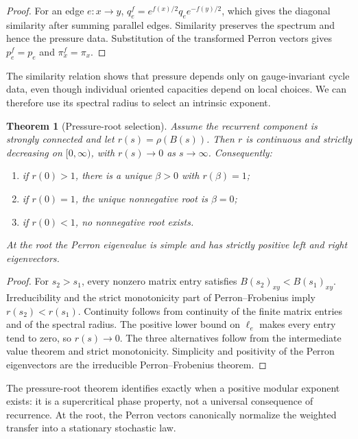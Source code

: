 \documentclass[11pt]{article}
\newtheorem{theorem}{Theorem}[section]
\theoremstyle{definition}
\theoremstyle{remark}
\begin{document}
\begin{proof}
For an edge $e:x\to y$,
$q_e^f=e^{f(x)/2}q_e e^{-f(y)/2}$, which gives the diagonal similarity after
summing parallel edges.  Similarity preserves the spectrum and hence the
pressure data.  Substitution of the transformed Perron vectors gives
$p_e^f=p_e$ and $\pi_x^f=\pi_x$.
\end{proof}

The similarity relation shows that pressure depends only on gauge-invariant cycle
data, even though individual oriented capacities depend on local choices.  We can
therefore use its spectral radius to select an intrinsic exponent.

\begin{theorem}[Pressure-root selection]
\label{thm:pressure-root}
Assume the recurrent component is strongly connected and let
$r(s)=\rho(B(s))$.  Then $r$ is continuous and strictly decreasing on
$[0,\infty)$, with $r(s)\to0$ as $s\to\infty$.  Consequently:
\begin{enumerate}[label=\textup{(\roman*)},leftmargin=2.4em]
\item if $r(0)>1$, there is a unique $\beta>0$ with $r(\beta)=1$;
\item if $r(0)=1$, the unique nonnegative root is $\beta=0$;
\item if $r(0)<1$, no nonnegative root exists.
\end{enumerate}
At the root the Perron eigenvalue is simple and has strictly positive left and
right eigenvectors.
\end{theorem}

\begin{proof}
For $s_2>s_1$, every nonzero matrix entry satisfies
$B(s_2)_{xy}<B(s_1)_{xy}$.  Irreducibility and the strict monotonicity part of
Perron--Frobenius imply $r(s_2)<r(s_1)$.  Continuity follows from continuity of
the finite matrix entries and of the spectral radius.  The positive lower
bound on $\ell_e$ makes every entry tend to zero, so $r(s)\to0$.  The three
alternatives follow from the intermediate value theorem and strict
monotonicity.  Simplicity and positivity of the Perron eigenvectors are the
irreducible Perron--Frobenius theorem.
\end{proof}

The pressure-root theorem identifies exactly when a positive modular exponent
exists: it is a supercritical phase property, not a universal consequence of
recurrence.  At the root, the Perron vectors canonically normalize the weighted
transfer into a stationary stochastic law.
\end{document}
